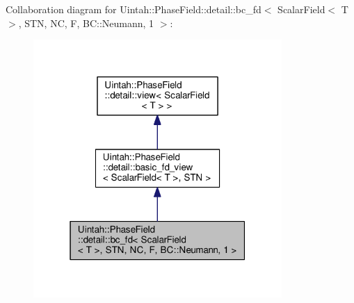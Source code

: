 Collaboration diagram for Uintah\+:\+:Phase\+Field\+:\+:detail\+:\+:bc\+\_\+fd$<$ Scalar\+Field$<$ T $>$, S\+TN, NC, F, BC\+:\+:Neumann, 1 $>$\+:\nopagebreak
\begin{figure}[H]
\begin{center}
\leavevmode
\includegraphics[width=268pt]{classUintah_1_1PhaseField_1_1detail_1_1bc__fd_3_01ScalarField_3_01T_01_4_00_01STN_00_01NC_00_01F8d776953deded199ac394e88759f6f6a}
\end{center}
\end{figure}
